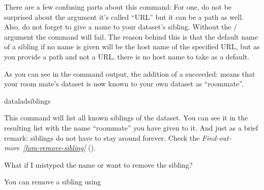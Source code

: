 \sphinxAtStartPar
There are a few confusing parts about this command: For one, do not be surprised
about the  argument \textendash{} it’s called “URL” but it can be a path as well.
Also, do not forget to give a name to your dataset’s sibling. Without the /
 argument the command will fail. The reason behind this is that the default
name of a sibling if no name is given will be the host name of the specified URL,
but as you provide a path and not a URL, there is no host name to take as a default.

\sphinxAtStartPar
As you can see in the command output, the addition of a {\hyperref[\detokenize{glossary:term-sibling}]{}} succeeded:
 means that your room mate’s dataset
is now known to your own dataset as “roommate”.

\ignorespaces 
\def\sphinxLiteralBlockLabel{\label{\detokenize{basics/101-121-siblings:index-3}}}
\begin{sphinxVerbatim}[commandchars=\\\{\}]
dataladsiblings
\end{sphinxVerbatim}

\sphinxAtStartPar
This command will list all known siblings of the dataset. You can see it
in the resulting list with the name “roommate” you have given to it.
And just as a brief remark: siblings do not have to stay around forever.
Check the \textit{Find-out-more}~{\findoutmoreiconinline}\textit{\ref{fom-remove-sibling}} {\hyperref[\detokenize{basics/101-121-siblings:fom-remove-sibling}]{}} ().

\ignorespaces \begin{findoutmore}[label={fom-remove-sibling}, before title={\thetcbcounter\ }, float, floatplacement=tbp, check odd page=true]{What if I mistyped the name or want to remove the sibling?}
\label{\detokenize{basics/101-121-siblings:fom-remove-sibling}}

\sphinxAtStartPar
You can remove a sibling using 


\end{findoutmore}

